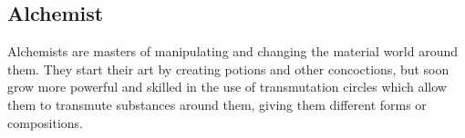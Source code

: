 \documentclass{article}
\begin{document}
\subsection{Alchemist}

Alchemists are masters of manipulating and changing the material world around them. They start their art by creating potions and other concoctions, but soon grow more powerful and skilled in the use of transmutation circles which allow them to transmute substances around them, giving them different forms or compositions.
\end{document}
